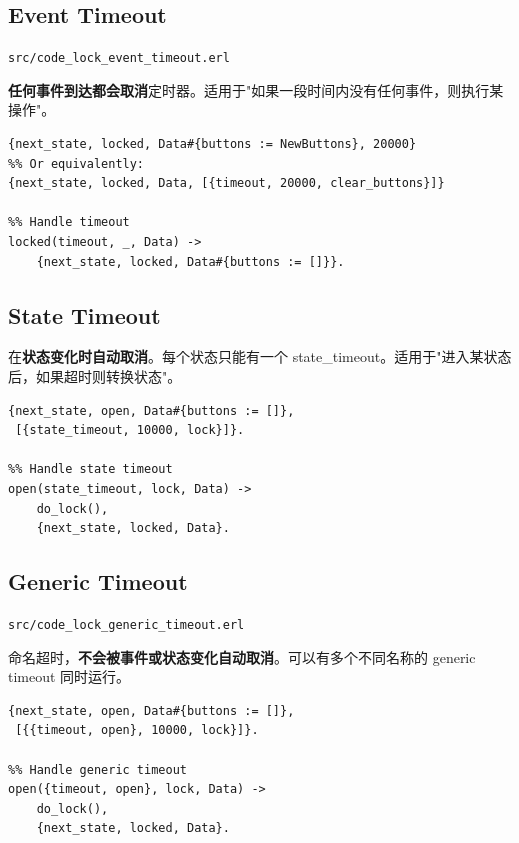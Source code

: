 \documentclass[a4paper,11pt]{article}
\begin{document}
\subsection{Event Timeout}

\begin{notebox}[源码文件]
\texttt{src/code\_lock\_event\_timeout.erl}
\end{notebox}

\textbf{任何事件到达都会取消}定时器。适用于"如果一段时间内没有任何事件，则执行某操作"。

\begin{lstlisting}[style=erlangstyle]
%% Set event timeout (20 seconds to clear buttons)
{next_state, locked, Data#{buttons := NewButtons}, 20000}
%% Or equivalently:
{next_state, locked, Data, [{timeout, 20000, clear_buttons}]}

%% Handle timeout
locked(timeout, _, Data) ->
    {next_state, locked, Data#{buttons := []}}.
\end{lstlisting}

\subsection{State Timeout}

在\textbf{状态变化时自动取消}。每个状态只能有一个 state\_timeout。适用于"进入某状态后，如果超时则转换状态"。

\begin{lstlisting}[style=erlangstyle]
%% Set state timeout when entering open state
{next_state, open, Data#{buttons := []},
 [{state_timeout, 10000, lock}]}.

%% Handle state timeout
open(state_timeout, lock, Data) ->
    do_lock(),
    {next_state, locked, Data}.
\end{lstlisting}

\subsection{Generic Timeout}

\begin{notebox}[源码文件]
\texttt{src/code\_lock\_generic\_timeout.erl}
\end{notebox}

命名超时，\textbf{不会被事件或状态变化自动取消}。可以有多个不同名称的 generic timeout 同时运行。

\begin{lstlisting}[style=erlangstyle]
%% Set generic timeout with name 'open'
{next_state, open, Data#{buttons := []},
 [{{timeout, open}, 10000, lock}]}.

%% Handle generic timeout
open({timeout, open}, lock, Data) ->
    do_lock(),
    {next_state, locked, Data}.
\end{lstlisting}
\end{document}
